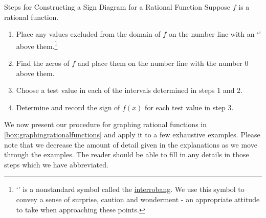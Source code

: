 \label{rationalsigndiagram}

\begin{ffloatbox}{Steps for Constructing a Sign Diagram for a Rational Function}
\label{box:signdiagramforrationalfunction}
Suppose $f$ is a rational function. 

\begin{enumerate}

\item  Place any values excluded from the domain of  $f$ on the number line with an `\textinterrobang' above them.\footnote{ `\textinterrobang' is a nonstandard symbol called the \href{http://en.wikipedia.org/wiki/Interrobang}{\underline{interrobang}}.   We use this symbol to convey a sense of surprise, caution and wonderment - an appropriate attitude to take when approaching these points.}   

\item  Find the zeros of $f$ and place them on the number line with the number $0$ above them.

\item  Choose a test value in each of the intervals determined in steps 1 and 2.

\item  Determine and record the sign of $f(x)$ for each test value in step 3.

\end{enumerate}

\end{ffloatbox}

We now present our procedure for graphing rational functions in \autoref{box:graphingrationalfunctions} and apply it to a few exhaustive examples.  Please note that we decrease the amount of detail given in the explanations as we move through the examples.  The reader should be able to fill in any details in those steps which we have abbreviated.

